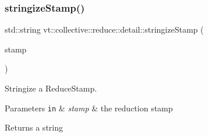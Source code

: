 \subsubsection{\texorpdfstring{stringize\+Stamp()}{stringizeStamp()}}
{\footnotesize\ttfamily std\+::string vt\+::collective\+::reduce\+::detail\+::stringize\+Stamp (\begin{DoxyParamCaption}\item[{\hyperlink{namespacevt_1_1collective_1_1reduce_1_1detail_aacc1fcd729d934ba143fee3a943bf9e7}{Reduce\+Stamp} const \&}]{stamp }\end{DoxyParamCaption})\hspace{0.3cm}{\ttfamily [inline]}}



Stringize a {\ttfamily Reduce\+Stamp}. 


\begin{DoxyParams}[1]{Parameters}
\mbox{\tt in}  & {\em stamp} & the reduction stamp\\
\hline
\end{DoxyParams}
\begin{DoxyReturn}{Returns}
a string 
\end{DoxyReturn}
